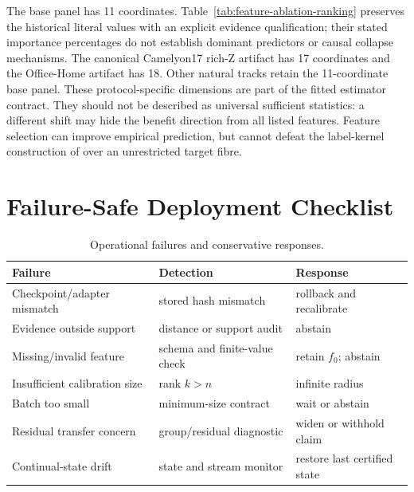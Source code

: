 \begin{table}[!t]
\centering
\scriptsize
\caption{Unverified historical feature-importance and ablation literals, preserved for auditability. No matching fitted-tree exports or per-fold dropped-feature errors were recovered. These values are not authenticated measurements and do not support a quantitative ranking or mechanism claim.}
\label{tab:feature-ablation-ranking}
\resizebox{\textwidth}{!}{}
\end{table}

The base panel has 11 coordinates. Table~\ref{tab:feature-ablation-ranking} preserves the historical literal values with an explicit evidence qualification; their stated importance percentages do not establish dominant predictors or causal collapse mechanisms. The canonical Camelyon17 rich-Z artifact has 17 coordinates and the
Office-Home artifact has 18. Other natural tracks retain the 11-coordinate base panel. These
protocol-specific dimensions are part of the fitted estimator contract. They should not be described as
universal sufficient statistics: a different shift may hide the benefit direction from all listed features. Feature
selection can improve empirical prediction, but cannot defeat the label-kernel construction of
 over an unrestricted target fibre.

\section{Failure-Safe Deployment Checklist}
\label{app:compact-deployment}

\begin{table}[t]
\centering
\scriptsize
\caption{Operational failures and conservative responses.}
\label{tab:compact-failures}
\begin{tabular}{@{}p{}p{}p{}@{}}
\toprule
Failure & Detection & Response \\
\midrule
Checkpoint/adapter mismatch & stored hash mismatch & rollback and recalibrate \\
Evidence outside support & distance or support audit & abstain \\
Missing/invalid feature & schema and finite-value check & retain $f_0$; abstain \\
Insufficient calibration size & rank $k>n$ & infinite radius \\
Batch too small & minimum-size contract & wait or abstain \\
Residual transfer concern & group/residual diagnostic & widen or withhold claim \\
Continual-state drift & state and stream monitor & restore last certified state \\
\bottomrule
\end{tabular}
\end{table}

